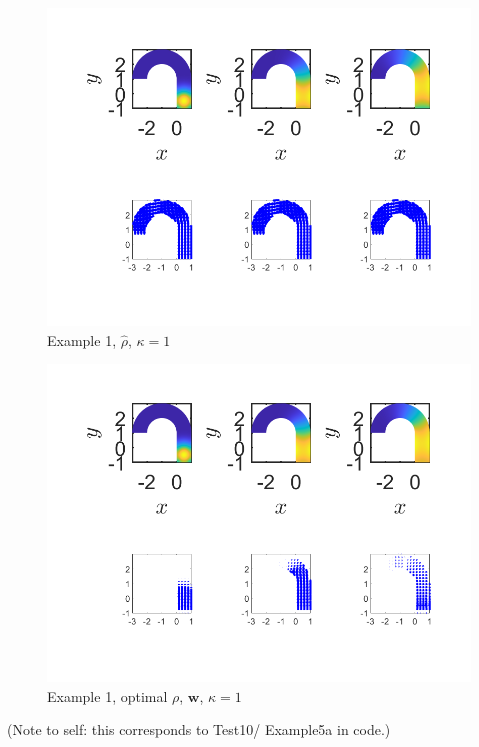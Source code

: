 \documentclass[11pt, a4paper]{article}
\theoremstyle{definition}
\newcommand{\w}{\mathbf{w}}
\begin{document}
\begin{figure}[h]
	\centering
	\includegraphics[scale=0.6]{FW11.png}
	\caption{Example 1, $\widehat \rho$, $\kappa = 1$} 
	\label{FEx1c}
\end{figure}
\begin{figure}[h]
	\centering
	\includegraphics[scale=0.6]{Opt11.png}
	\caption{Example 1, optimal $\rho$, $\w$, $\kappa = 1$} 
	\label{FEx1d}
\end{figure}
(Note to self: this corresponds to Test10/ Example5a in code.)
\end{document}
